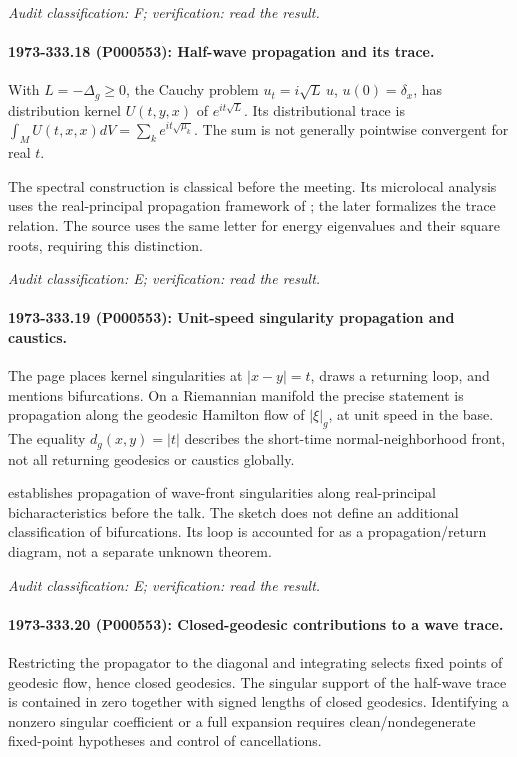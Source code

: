 \emph{Audit classification: F; verification: read the result.}

\paragraph{1973-333.18 (P000553): Half-wave propagation and its trace.}
With \(L=-\Delta_g\ge0\), the Cauchy problem \(u_t=i\sqrt L\,u\), \(u(0)=\delta_x\), has distribution kernel \(U(t,y,x)\) of \(e^{it\sqrt L}\). Its distributional trace is \(\int_M U(t,x,x)dV=\sum_k e^{it\sqrt{\mu_k}}\). The sum is not generally pointwise convergent for real \(t\).

The spectral construction is classical before the meeting. Its microlocal analysis uses the real-principal propagation framework of \citet[\S6.1]{duistermaathormander1972fourierii}; the later \citet{duistermaatguillemin1975spectrum} formalizes the trace relation. The source uses the same letter for energy eigenvalues and their square roots, requiring this distinction.

\emph{Audit classification: E; verification: read the result.}

\paragraph{1973-333.19 (P000553): Unit-speed singularity propagation and caustics.}
The page places kernel singularities at \(|x-y|=t\), draws a returning loop, and mentions bifurcations. On a Riemannian manifold the precise statement is propagation along the geodesic Hamilton flow of \(|\xi|_g\), at unit speed in the base. The equality \(d_g(x,y)=|t|\) describes the short-time normal-neighborhood front, not all returning geodesics or caustics globally.

\citet[Theorem6.1.1]{duistermaathormander1972fourierii} establishes propagation of wave-front singularities along real-principal bicharacteristics before the talk. The sketch does not define an additional classification of bifurcations. Its loop is accounted for as a propagation/return diagram, not a separate unknown theorem.

\emph{Audit classification: E; verification: read the result.}

\paragraph{1973-333.20 (P000553): Closed-geodesic contributions to a wave trace.}
Restricting the propagator to the diagonal and integrating selects fixed points of geodesic flow, hence closed geodesics. The singular support of the half-wave trace is contained in zero together with signed lengths of closed geodesics. Identifying a nonzero singular coefficient or a full expansion requires clean/nondegenerate fixed-point hypotheses and control of cancellations.

